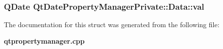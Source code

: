 \subsubsection[{val}]{\setlength{\rightskip}{0pt plus 5cm}Q\+Date Qt\+Date\+Property\+Manager\+Private\+::\+Data\+::val}\label{structQtDatePropertyManagerPrivate_1_1Data_a24deae618481e684de40d0e45068f33b}


The documentation for this struct was generated from the following file\+:\begin{DoxyCompactItemize}
\item 
{\bf qtpropertymanager.\+cpp}\end{DoxyCompactItemize}
